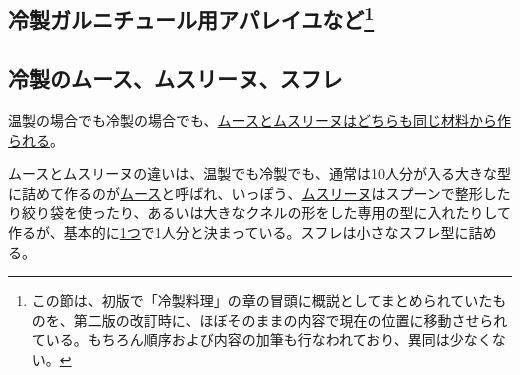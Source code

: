 \href{未、原文対照チェック}{} \href{未、日本語表現校正}{}
\href{未、その他修正}{} \href{未、原稿最終校正}{}
\begin{Main}
\hypertarget{serie-des-appareiles-et-preparations-diverses-pour-garnitures-froides}{%
\section[冷製ガルニチュール用アパレイユなど]{\texorpdfstring{冷製ガルニチュール用アパレイユなど\footnote{この節は、初版で「冷製料理」の章の冒頭に概説としてまとめられていたものを、第二版の改訂時に、ほぼそのままの内容で現在の位置に移動させられている。もちろん順序および内容の加筆も行なわれており、異同は少なくない。}}{冷製ガルニチュール用アパレイユなど}}\label{serie-des-appareiles-et-preparations-diverses-pour-garnitures-froides}}



\hypertarget{mousses-mousselines-et-souffles-froids}{%
\subsection{冷製のムース、ムスリーヌ、スフレ}\label{mousses-mousselines-et-souffles-froids}}



温製の場合でも冷製の場合でも、\ul{ムースとムスリーヌはどちらも同じ材料から作られる}。

ムースとムスリーヌの違いは、温製でも冷製でも、通常は10人分が入る大きな型に詰めて作るのが\ul{ムース}と呼ばれ、いっぽう、\ul{ムスリーヌ}はスプーンで整形したり絞り袋を使ったり、あるいは大きなクネルの形をした専用の型に入れたりして作るが、基本的に\ul{1つ}で1人分と決まっている。スフレは小さなスフレ型に詰める。
\end{Main}
